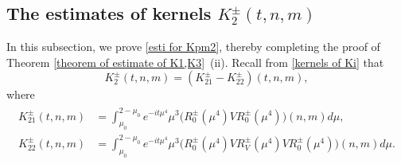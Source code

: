 \documentclass[reqno, 11pt]{amsart}
\numberwithin{equation}{section}
\begin{document}
\subsection{The estimates of kernels $K^{\pm}_2(t,n,m)$}\label{subse of K2}
In this subsection, we prove \eqref{esti for Kpm2}, thereby completing the proof of Theorem \ref{theorem of estimate of K1,K3}~(ii). Recall from \eqref{kernels of Ki} that
\begin{equation*}
K^{\pm}_{2}(t,n,m)=\left(K^{\pm}_{21}-K^{\pm}_{22}\right)(t,n,m),
\end{equation*}
where
\begin{align}\label{kernels of Kpm21,22}
\begin{split}
K^{\pm}_{21}(t,n,m)&=\int_{\mu_0}^{2-\mu_0}e^{-it\mu^4}\mu^3\big(R^{\pm}_{0}(\mu^4)VR^{\pm}_{0}(\mu^4)\big)(n,m)d\mu,\\
K^{\pm}_{22}(t,n,m)&=\int_{\mu_0}^{2-\mu_0}e^{-it\mu^4}\mu^3\big(R^{\pm}_{0}(\mu^4)VR^{\pm}_V(\mu^4)VR^{\pm}_{0}(\mu^4)\big)(n,m)d\mu.
\end{split}
\end{align}
\end{document}
